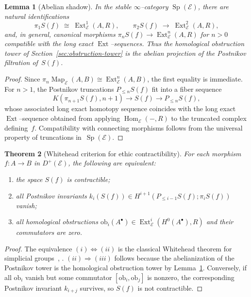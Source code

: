\documentclass[12pt]{article}
\DeclareMathOperator{\Map}{Map}
\DeclareMathOperator{\Sp}{Sp}
\newcommand{\E}{\mathcal{E}}
\newcommand{\Hom}{\operatorname{Hom}}
\newcommand{\Ext}{\operatorname{Ext}}
\theoremstyle{plain}
\newtheorem{theorem}{Theorem}[section]
\newtheorem{lemma}[theorem]{Lemma}
\theoremstyle{definition}
\theoremstyle{remark}
\numberwithin{equation}{section}
\begin{document}
\begin{lemma}[Abelian shadow]\label{lem:abelian-shadow}
In the stable $\infty$–category $\Sp(\E)$, there are natural identifications
\[
\pi_1S(f)\;\cong\;\Ext^1_\E(A,R),
\qquad
\pi_2S(f)\;\longrightarrow\;\Ext^2_\E(A,R),
\]
and, in general, canonical morphisms
$\pi_nS(f)\to\Ext^n_\E(A,R)$ for $n>0$ compatible with the long exact $\Ext$--sequences.
Thus the homological obstruction tower of Section~\ref{sec:obstruction-tower}
is the abelian projection of the Postnikov filtration of~$S(f)$.
\end{lemma}

\begin{proof}
Since $\pi_n\Map_\E(A,B)\cong\Ext^n_\E(A,B)$, the first equality is immediate.  
For $n>1$, the Postnikov truncations $P_{\le n}S(f)$ fit into a fiber sequence
\[
K(\pi_{n+1}S(f),n{+}1)\to S(f)\to P_{\le n}S(f),
\]
whose associated long exact homotopy sequence coincides with the long exact $\Ext$–sequence obtained from applying $\Hom_\E(-,R)$ to the truncated complex defining~$f$.
Compatibility with connecting morphisms follows from the universal property of truncations in~$\Sp(\E)$.
\end{proof}

\begin{theorem}[Whitehead criterion for ethic contractibility]\label{th:whitehead-criterion}
For each morphism $f:A\to B$ in $D^+(\E)$, the following are equivalent:
\begin{enumerate}[label=(\roman*)]
\item the space $S(f)$ is contractible;
\item all Postnikov invariants $k_i(S(f))\in H^{i+1}(P_{\le i-1}S(f);\pi_iS(f))$ vanish;
\item all homological obstructions $\mathrm{ob}_i(A^\bullet)\in\Ext^i_\E(H^0(A^\bullet),R)$
and their commutators are zero.
\end{enumerate}
\end{theorem}

\begin{proof}
The equivalence $(i)\Leftrightarrow(ii)$ is the classical Whitehead theorem
for simplicial groups~\cite{Whitehead1949}, \cite{Quillen1967}.  
$(ii)\Rightarrow(iii)$ follows because the abelianization of the Postnikov tower is the homological obstruction tower by Lemma~\ref{lem:abelian-shadow}.
Conversely, if all $\mathrm{ob}_i$ vanish but some commutator $[\mathrm{ob}_i,\mathrm{ob}_j]$ is nonzero,
the corresponding Postnikov invariant $k_{i+j}$ survives, so $S(f)$ is not contractible.
\end{proof}
\end{document}
